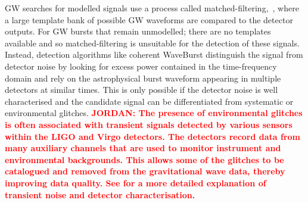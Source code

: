 \documentclass[12pt]{iopart}
\newcommand{\jordan}[1]{\textbf{\textcolor{red}{JORDAN: #1}}}
\begin{document}
%
GW searches for modelled signals use a process called
matched-filtering,~\cite{Owen1998,Usman_2016,sachdev2019gstlal}, where a large template bank of possible
GW waveforms are compared to the detector outputs. For GW bursts that remain unmodelled; there are no
templates available and so matched-filtering is unsuitable for the detection of
these signals.  Instead, detection algorithms like coherent WaveBurst \cite{drago2020coherent} distinguish the signal from
detector noise by looking for excess power contained in the time-frequency
domain and rely on the
astrophysical burst waveform appearing in multiple detectors at similar times.
This is only possible if the detector noise is well characterised and the
candidate signal can be differentiated from systematic or environmental
glitches. \jordan{The presence of environmental glitches is often associated with transient signals detected by various sensors within the LIGO and Virgo detectors.  The detectors record data from many auxiliary channels that are used to monitor instrument and environmental backgrounds. This allows some of the glitches to be catalogued and removed from the gravitational wave data, thereby improving data quality. See \cite{Abbott_2016_noise2,Abbott_2020_noise1} for a more detailed explanation of transient noise and detector characterisation.} 
\end{document}
